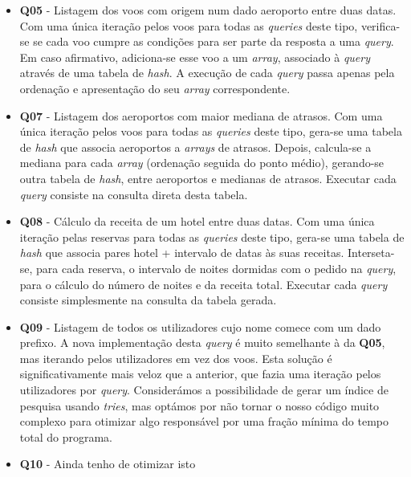 \documentclass[12pt, a4paper]{article}
\begin{document}
\begin{itemize}
    \item \textbf{Q05} - Listagem dos voos com origem num dado aeroporto entre duas datas. Com uma
                         única iteração pelos voos para todas as \emph{queries} deste tipo,
                         verifica-se se cada voo cumpre as condições para ser parte da resposta
                         a uma \emph{query}. Em caso afirmativo, adiciona-se esse voo a um
                         \emph{array}, associado à \emph{query} através de uma tabela de
                         \emph{hash}. A execução de cada \emph{query} passa apenas pela ordenação e
                         apresentação do seu \emph{array} correspondente.

    \item \textbf{Q07} - Listagem dos aeroportos com maior mediana de atrasos. Com uma única
                         iteração pelos voos para todas as \emph{queries} deste tipo, gera-se uma
                         tabela de \emph{hash} que associa aeroportos a \emph{arrays} de atrasos.
                         Depois, calcula-se a mediana para cada \emph{array} (ordenação seguida do
                         ponto médio), gerando-se outra tabela de \emph{hash}, entre aeroportos e
                         medianas de atrasos. Executar cada \emph{query} consiste na consulta direta
                         desta tabela.

    \item \textbf{Q08} - Cálculo da receita de um hotel entre duas datas. Com uma única iteração
                         pelas reservas para todas as \emph{queries} deste tipo, gera-se uma tabela
                         de \emph{hash} que associa pares hotel + intervalo de datas às suas
                         receitas. Interseta-se, para cada reserva, o intervalo de noites dormidas
                         com o pedido na \emph{query}, para o cálculo do número de noites e da
                         receita total. Executar cada \emph{query} consiste simplesmente na consulta
                         da tabela gerada.

    \item \textbf{Q09} - Listagem de todos os utilizadores cujo nome comece com um dado prefixo. A
                         nova implementação desta \emph{query} é muito semelhante à da \textbf{Q05},
                         mas iterando pelos utilizadores em vez dos voos. Esta solução é
                         significativamente mais veloz que a anterior, que fazia uma iteração pelos
                         utilizadores por \emph{query}. Considerámos a possibilidade
                         de gerar um índice de pesquisa usando \emph{tries}, mas optámos por não
                         tornar o nosso código muito complexo para otimizar algo responsável por uma
                         fração mínima do tempo total do programa.

    \item \textbf{Q10} - {\color{red}Ainda tenho de otimizar isto}
\end{itemize}
\end{document}
